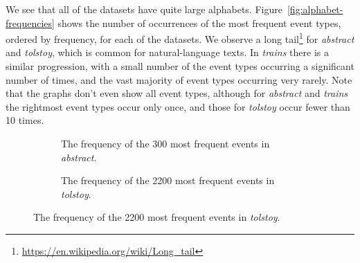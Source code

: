 We see that all of the datasets have quite large alphabets. Figure~\ref{fig:alphabet-frequencies} shows the number of occurrences of the most frequent event types, ordered by frequency, for each of the datasets. We observe a long tail\footnote{\url{https://en.wikipedia.org/wiki/Long_tail}} for \emph{abstract} and \emph{tolstoy}, which is common for natural-language texts. In \emph{trains} there is a similar progression, with a small number of the event types occurring a significant number of times, and the vast majority of event types occurring very rarely. Note that the graphs don't even show all event types, although for \emph{abstract} and \emph{trains} the rightmost event types occur only once, and those for \emph{tolstoy} occur fewer than 10 times.

\begin{figure}

\begin{subfigure}[b]{0.48\textwidth}
\centering


\caption{The frequency of the 300 most frequent events in \emph{abstract}.}
\label{fig:frequency-plot-nsf}
\end{subfigure}\hfill%
\begin{subfigure}[b]{0.48\textwidth}
\centering


\caption{The frequency of the 2200 most frequent events in \emph{tolstoy}.}
\label{fig:frequency-plot-tolstoy}
\end{subfigure}


\end{figure}
